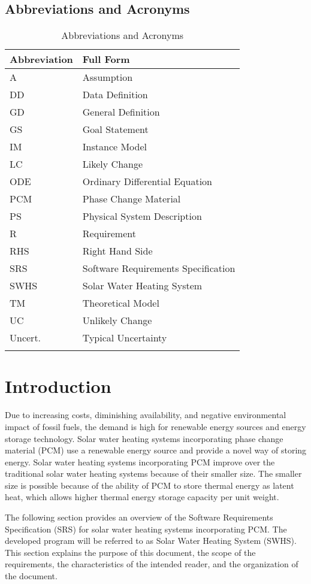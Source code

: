 \documentclass[12pt]{article}
\begin{document}
\subsection{Abbreviations and Acronyms}
\label{Sec:TAbbAcc}
\begin{longtable}{l l}
\toprule
\textbf{Abbreviation} & \textbf{Full Form}
\\
\midrule
\endhead
A & Assumption
\\
DD & Data Definition
\\
GD & General Definition
\\
GS & Goal Statement
\\
IM & Instance Model
\\
LC & Likely Change
\\
ODE & Ordinary Differential Equation
\\
PCM & Phase Change Material
\\
PS & Physical System Description
\\
R & Requirement
\\
RHS & Right Hand Side
\\
SRS & Software Requirements Specification
\\
SWHS & Solar Water Heating System
\\
TM & Theoretical Model
\\
UC & Unlikely Change
\\
Uncert. & Typical Uncertainty
\\
\bottomrule
\caption{Abbreviations and Acronyms}
\label{Table:TAbbAcc}
\end{longtable}
\section{Introduction}
\label{Sec:Intro}
Due to increasing costs, diminishing availability, and negative environmental impact of fossil fuels, the demand is high for renewable energy sources and energy storage technology. Solar water heating systems incorporating phase change material (PCM) use a renewable energy source and provide a novel way of storing energy. Solar water heating systems incorporating PCM improve over the traditional solar water heating systems because of their smaller size. The smaller size is possible because of the ability of PCM to store thermal energy as latent heat, which allows higher thermal energy storage capacity per unit weight.

The following section provides an overview of the Software Requirements Specification (SRS) for solar water heating systems incorporating PCM. The developed program will be referred to as Solar Water Heating System (SWHS). This section explains the purpose of this document, the scope of the requirements, the characteristics of the intended reader, and the organization of the document.
\end{document}

